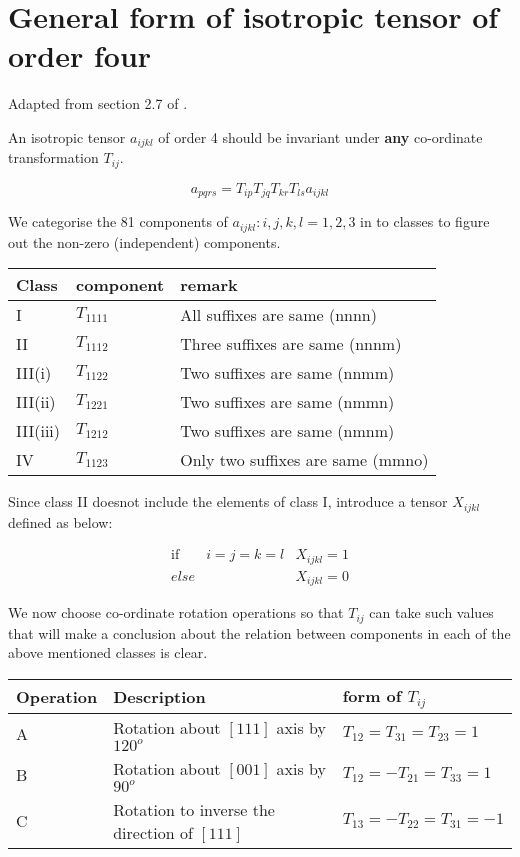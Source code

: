 \section{General form of isotropic tensor of order four}
\label{isotensorfour}

Adapted from section 2.7 of \cite{aris}.

An isotropic tensor $a_{ijkl}$ of order 4 should be invariant under {\bf any} co-ordinate transformation $T_{ij}$.

$$ a_{pqrs} = T_{ip} T_{jq} T_{kr} T_{ls} a_{ijkl} $$

We categorise the 81 components of $a_{ijkl} : i,j,k,l = 1,2,3$ in to classes to figure out the non-zero (independent) components. 

\begin{center}
\begin{tabular}{|l|l|l|}
\hline
Class & component & remark \\
\hline
I & $T_{1111}$ & All suffixes are same (nnnn)\\ 
II & $T_{1112}$ & Three suffixes are same (nnnm)\\ 
III(i) & $T_{1122}$ & Two suffixes are same (nnmm)\\ 
III(ii) & $T_{1221}$ & Two suffixes are same (nmmn) \\ 
III(iii) & $T_{1212}$ & Two suffixes are same (nmnm)  \\ 
IV & $T_{1123}$ & Only two suffixes are same (mmno)\\ 
\hline
\end{tabular}
\end{center}


Since class II doesnot include the elements of class I, introduce a tensor $X_{ijkl}$ defined as below:


\begin{equation}
\begin{array}{rll}
\mathrm{if} & i=j=k=l & X_{ijkl} = 1 \\
else &  & X_{ijkl}=0 
\end{array}
\end{equation}

We now choose co-ordinate rotation operations so that $T_{ij}$ can take such values that will make a conclusion about the relation between components in each of the above mentioned classes is clear. 

\begin{center}
\begin{tabular}{|l|l|l|}
\hline
Operation & Description & form of $T_{ij}$ \\
\hline
 A & Rotation about $[111]$ axis by $120^o$ & $T_{12} = T_{31} = T_{23} = 1$ \\ 
 B & Rotation about $[001]$ axis by $90^o$ & $T_{12} = -T_{21} = T_{33} = 1$ \\ 
 C & Rotation to inverse the direction of $[111]$ & $T_{13} = -T_{22} = T_{31} = -1$ \\ 
\hline
\end{tabular}
\end{center}


